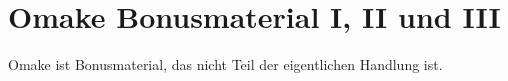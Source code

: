 \chapter{Omake Bonusmaterial I, II und III\protect\footnotemark}

\begin{chapterOpeningAuthorNote}

Omake ist Bonusmaterial, das nicht Teil der eigentlichen Handlung ist.%
\end{chapterOpeningAuthorNote}




